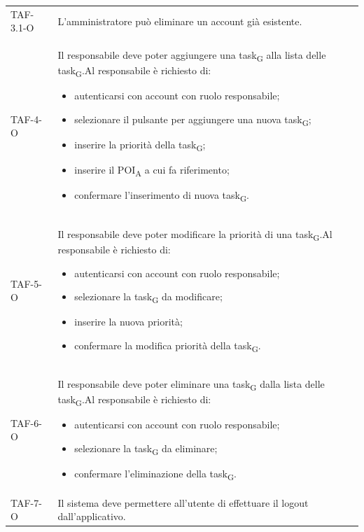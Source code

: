 \begin{longtable}{ >{\centering}p{} >{}p{}
		>{\centering}p{}}
	TAF-3.1-O & L'amministratore può eliminare un account già esistente. & 0\tabularnewline

	TAF-4-O & Il responsabile deve poter aggiungere una \gls{task}\textsubscript{G} alla lista delle \gls{task}\textsubscript{G}.\newline Al responsabile è richiesto di: \begin{itemize}\item autenticarsi con account con ruolo responsabile; \item selezionare il pulsante per aggiungere una nuova \gls{task}\textsubscript{G}; \item inserire la priorità della \gls{task}\textsubscript{G}; \item inserire il \acrshort{POI}\textsubscript{A} a cui fa riferimento; \item confermare l'inserimento di nuova \gls{task}\textsubscript{G}. \end{itemize} & 0\tabularnewline

	TAF-5-O & Il responsabile deve poter modificare la priorità di una \gls{task}\textsubscript{G}.\newline Al responsabile è richiesto di: \begin{itemize}\item autenticarsi con account con ruolo responsabile; \item selezionare la \gls{task}\textsubscript{G} da modificare; \item inserire la nuova priorità; \item confermare la modifica priorità della \gls{task}\textsubscript{G}. \end{itemize} & 0\tabularnewline

	TAF-6-O & Il responsabile deve poter eliminare una \gls{task}\textsubscript{G} dalla lista delle \gls{task}\textsubscript{G}.\newline Al responsabile è richiesto di: \begin{itemize} \item autenticarsi con account con ruolo responsabile; \item selezionare la \gls{task}\textsubscript{G} da eliminare; \item confermare l'eliminazione della \gls{task}\textsubscript{G}. \end{itemize} & 0\tabularnewline

	TAF-7-O & Il sistema deve permettere all'utente di effettuare il logout dall'applicativo. & 0\tabularnewline


\end{longtable}
